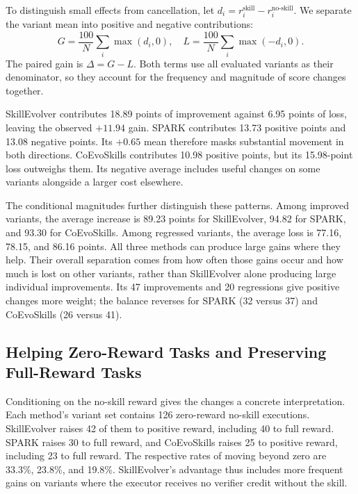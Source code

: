 To distinguish small effects from cancellation, let $d_i=r_i^{\mathrm{skill}}-r_i^{\mathrm{no\text{-}skill}}$. We separate the variant mean into positive and negative contributions:
\begin{equation}
G=\frac{100}{N}\sum_i\max(d_i,0),\quad
L=\frac{100}{N}\sum_i\max(-d_i,0).
\end{equation}
The paired gain is $\Delta=G-L$. Both terms use all evaluated variants as their denominator, so they account for the frequency and magnitude of score changes together.

SkillEvolver contributes 18.89 points of improvement against 6.95 points of loss, leaving the observed $+11.94$ gain. SPARK contributes 13.73 positive points and 13.08 negative points. Its $+0.65$ mean therefore masks substantial movement in both directions. CoEvoSkills contributes 10.98 positive points, but its 15.98-point loss outweighs them. Its negative average includes useful changes on some variants alongside a larger cost elsewhere.

The conditional magnitudes further distinguish these patterns. Among improved variants, the average increase is 89.23 points for SkillEvolver, 94.82 for SPARK, and 93.30 for CoEvoSkills. Among regressed variants, the average loss is 77.16, 78.15, and 86.16 points. All three methods can produce large gains where they help. Their overall separation comes from how often those gains occur and how much is lost on other variants, rather than SkillEvolver alone producing large individual improvements. Its 47 improvements and 20 regressions give positive changes more weight; the balance reverses for SPARK (32 versus 37) and CoEvoSkills (26 versus 41).

\subsection{Helping Zero-Reward Tasks and Preserving Full-Reward Tasks}

Conditioning on the no-skill reward gives the changes a concrete interpretation. Each method's variant set contains 126 zero-reward no-skill executions. SkillEvolver raises 42 of them to positive reward, including 40 to full reward. SPARK raises 30 to full reward, and CoEvoSkills raises 25 to positive reward, including 23 to full reward. The respective rates of moving beyond zero are 33.3\%, 23.8\%, and 19.8\%. SkillEvolver's advantage thus includes more frequent gains on variants where the executor receives no verifier credit without the skill.

